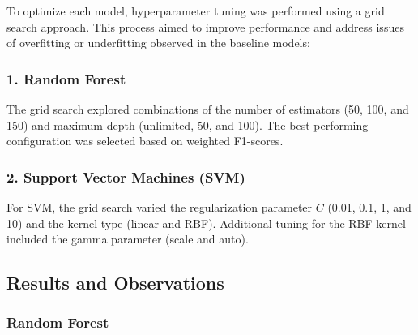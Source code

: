         To optimize each model, hyperparameter tuning was performed using a grid search approach. This process aimed to improve performance and address issues of overfitting or underfitting observed in the baseline models:

        \subsubsection*{1. Random Forest \\}
        
            The grid search explored combinations of the number of estimators (50, 100, and 150) and maximum depth (unlimited, 50, and 100). The best-performing configuration was selected based on weighted F1-scores.

        \subsubsection*{2. Support Vector Machines (SVM) \\}
        
            For SVM, the grid search varied the regularization parameter \( C \) (0.01, 0.1, 1, and 10) and the kernel type (linear and RBF). Additional tuning for the RBF kernel included the gamma parameter (scale and auto).

    \subsection{Results and Observations}

        \subsubsection{Random Forest}
            
